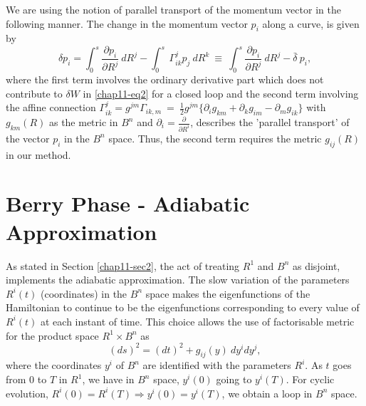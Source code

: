 We are using the notion of parallel transport of the momentum vector in the following manner. The change in the  momentum vector $p_i$ along a curve, is given by 
\setcounter{equation}{3}
\begin{equation}
\delta p_i= \int_0^s \frac{\partial p_i}{\partial R^j}\ dR^j-\int_0^s\ {\Gamma}^j_{ik}p_j\ dR^k\ \equiv\ \int_0^s \frac{\partial p_i}{\partial R^j}\ dR^j-\bar{\delta}\ p_i, \label{chap11-eq4}
\end{equation}
where the first term involves the ordinary derivative part which does not contribute to $\delta W$ in \eqref{chap11-eq2} for  a closed loop and the second term involving the affine connection ${\Gamma}^j_{ik} = g^{jm}{\Gamma}_{ik,m}\  =\ \frac{1}{2}g^{jm}\{{\partial}_ig_{km}+{\partial}_kg_{im}-{\partial}_mg_{ik}\}$ with $g_{km}(R)$ as the metric  in $B^n$ and ${\partial}_i=\frac{\partial}{\partial R^i}$, describes the 'parallel transport' of the vector $p_i$  in the $B^n$ space. Thus, the second term requires the metric $g_{ij}(R)$ in our method.  

\section{Berry Phase - Adiabatic Approximation}\label{chap11-sec3}

As stated in Section \ref{chap11-sec2}, the act of treating $R^1$ and $B^n$ as disjoint, implements the adiabatic approximation.  The slow variation of the parameters $R^i(t)$ (coordinates) in the $B^n$ space makes the eigenfunctions of the  Hamiltonian to continue to be the eigenfunctions corresponding to every value of $R^i(t)$ at each instant of  time. This choice allows the use of factorisable metric for the product space $R^1\times B^n$ as 
\setcounter{equation}{4}
\begin{equation}
(ds)^2= (dt)^2+g_{ij}(y)\ dy^idy^j,\label{chap11-eq5}
\end{equation}
where the coordinates $y^i$ of $B^n$ are identified with the parameters $R^i$. As $t$ goes from $0$ to $T$ in  $R^1$, we have in $B^n$ space, $y^i(0)$ going to $y^i(T)$. For cyclic evolution, $R^i(0)=R^i(T)\Rightarrow  y^i(0)=y^i(T)$, we obtain a loop in $B^n$ space. 

